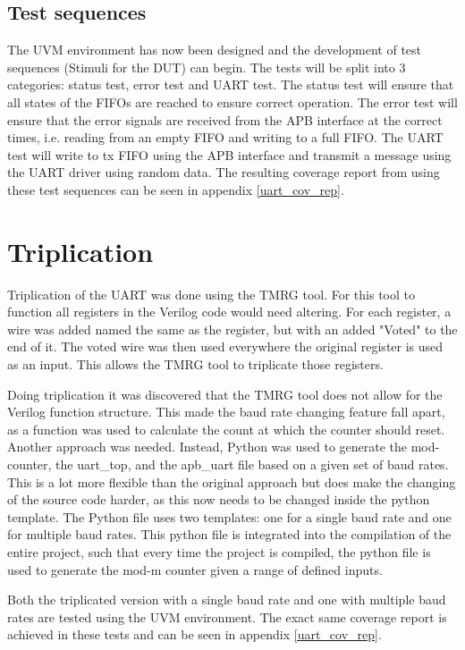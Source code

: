 \documentclass[./dissertation.tex]{subfiles}
\begin{document}
\subsection{Test sequences}
The UVM environment has now been designed and the development of test sequences (Stimuli for the DUT) can begin. The tests will be split into 3 categories: status test, error test and UART test. The status test will ensure that all states of the FIFOs are reached to ensure correct operation. The error test will ensure that the error signals are received from the APB interface at the correct times, i.e. reading from an empty FIFO and writing to a full FIFO. The UART test will write to tx FIFO using the APB interface and transmit a message using the UART driver using random data. The resulting coverage report from using these test sequences can be seen in appendix \ref{uart_cov_rep}. 

\section{Triplication}
Triplication of the UART was done using the TMRG tool. For this tool to function all registers in the Verilog code would need altering. For each register, a wire was added named the same as the register, but with an added "Voted" to the end of it. The voted wire was then used everywhere the original register is used as an input. This allows the TMRG tool to triplicate those registers.

Doing triplication it was discovered that the TMRG tool does not allow for the Verilog function structure. This made the baud rate changing feature fall apart, as a function was used to calculate the count at which the counter should reset. Another approach was needed. Instead, Python was used to generate the mod-counter, the uart\_top, and the apb\_uart file based on a given set of baud rates. This is a lot more flexible than the original approach but does make the changing of the source code harder, as this now needs to be changed inside the python template. The Python file uses two templates: one for a single baud rate and one for multiple baud rates. This python file is integrated into the compilation of the entire project, such that every time the project is compiled, the python file is used to generate the mod-m counter given a range of defined inputs. 

Both the triplicated version with a single baud rate and one with multiple baud rates are tested using the UVM environment. The exact same coverage report is achieved in these tests and can be seen in appendix \ref{uart_cov_rep}.
\end{document}
